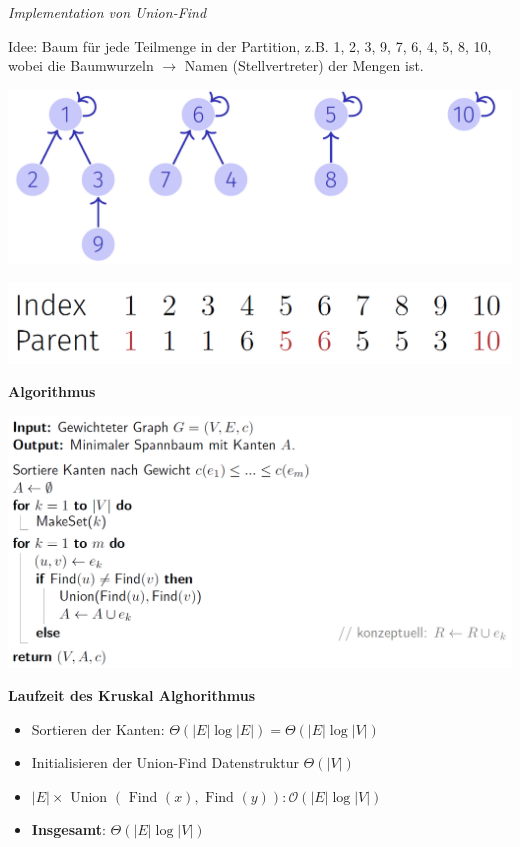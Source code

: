 \begin{sectionbox}
\textit{Implementation von Union-Find}\par
Idee: Baum für jede Teilmenge in der Partition, z.B. {{1, 2, 3, 9}, {7, 6, 4}, {5, 8}, {10}}, wobei die Baumwurzeln $\to$ Namen (Stellvertreter) der Mengen ist.\par\smallskip
\begin{center}
    \includegraphics[width = 0.7\columnwidth]{../img/UF.png}\par\smallskip
    \includegraphics[width = 0.7\columnwidth]{../img/UFarray.png}\par\smallskip
\end{center}
\end{sectionbox}
\vspace{-4pt}
\begin{sectionbox}
\textbf{Algorithmus}\par
\includegraphics[width = \columnwidth]{../img/Kruskal.png}\par\smallskip

\textbf{Laufzeit des Kruskal Alghorithmus}\par
\begin{itemize}
    \item Sortieren der Kanten: $\Theta(|E| \log |E|)=\Theta(|E| \log |V|)$
    \item Initialisieren der Union-Find Datenstruktur $\Theta(|V|)$
    \item $|E| \times \text { Union }(\text { Find }(x), \text { Find }(y)): \mathcal{O}(|E| \log |V|)$
    \item \textbf{Insgesamt}: $\Theta(|E| \log |V|)$
\end{itemize}%
\end{sectionbox}

